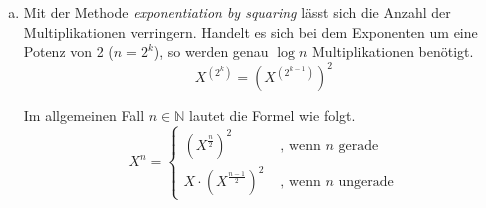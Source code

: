 \documentclass[a4paper]{scrartcl}
\begin{document}
\begin{enumerate}[(a)]
\begin{proof}[Beweis durch vollständige Induktion]
\begin{equation}
\begin{split}
\begin{pmatrix}
                        F_0 \\ F_1
                    \end{pmatrix}
                    &=
                    \begin{pmatrix}
                        F_n \\ F_{n+1}
                    \end{pmatrix} \\
                    \gdw
                    \begin{pmatrix}
                        0 & 1 \\
                        1 & 1
                    \end{pmatrix}^{n+1}
                    \cdot
                    \begin{pmatrix}
                        F_0 \\ F_1
                    \end{pmatrix}
                    &=
                    \begin{pmatrix}
                        F_n \\ F_{n+1}
                    \end{pmatrix}
                \end{split}
            \end{equation}
            $(\star)$ Definition der Fibonacci-Folge \\
            $(\star\star)$ Induktions-Annahme
        \end{proof}

    \item
        Mit der Methode \emph{exponentiation by squaring} lässt sich die Anzahl
        der Multiplikationen verringern.
        Handelt es sich bei dem Exponenten um eine Potenz von 2 ($n = 2^k$),
        so werden genau $\log n$ Multiplikationen benötigt.
        \begin{equation}
            X^{(2^k)} = \left( X^{(2^{k-1})} \right)^2
        \end{equation}

        Im allgemeinen Fall $n \in \mathbb{N}$ lautet die Formel wie folgt.
        \begin{equation}
            X^n = \begin{cases}
                \left( X^{\frac{n}{2}} \right)^2 & \text{ , wenn $n$ gerade} \\
                X \cdot \left( X^{\frac{n-1}{2}} \right)^2 & \text{ , wenn $n$ ungerade}
            \end{cases}
        \end{equation}


\end{enumerate}
\end{document}
